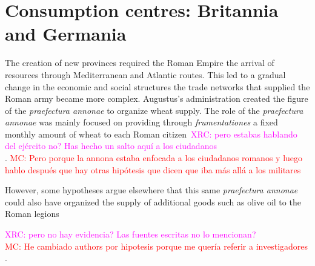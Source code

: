 \documentclass[review]{elsarticle}
\newcommand{\memo}[2]{\textcolor{#1}{#2}}
\newcommand{\maria}[1]{\memo{red}{MC: #1\\}}
\newcommand{\xavi}[1]{\memo{magenta}{XRC: #1\\}}
\begin{document}

\section{Consumption centres: Britannia and Germania}

The creation of new provinces required the Roman Empire the arrival of resources through Mediterranean and Atlantic routes.
This led to a gradual change in the economic and social structures the trade networks that supplied the Roman army became more complex. Augustus's administration created the figure of the \textit{praefectura annonae} to organize wheat supply. The role of the \textit{praefectura annonae} was mainly focused on providing through \textit{frumentationes} a fixed monthly amount of wheat to each Roman citizen~\citep{remesal_annona_1986,remesal_concierto}\xavi{pero estabas hablando del ejército no? Has hecho un salto aquí a los ciudadanos}. 
\maria{Pero porque la annona estaba enfocada a los ciudadanos romanos y luego hablo después que hay otras hipótesis que dicen que iba más allá a los militares}

However, some hypotheses argue elsewhere that this same \textit{praefectura annonae} could also have organized the supply of additional goods such as olive oil to the Roman legions  \citep{remesal_annona_1986,
remesal_annona_1990}

\xavi{pero no hay evidencia? Las fuentes escritas no lo mencionan?}
\maria{He cambiado authors por hipotesis porque me quería referir a investigadores}.

 
\end{document}
